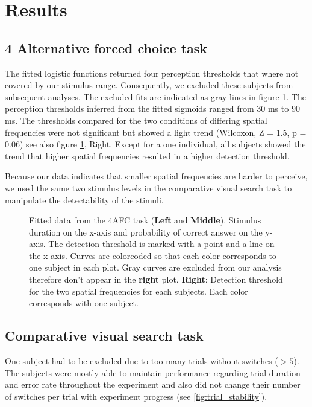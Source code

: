 \newpage
\section{Results}

\subsection{4 Alternative forced choice task}

The fitted logistic functions returned four perception thresholds that where not covered by our stimulus range. Consequently, we excluded these subjects from subsequent analyses. The excluded fits are indicated as gray lines in figure \ref{fig:4afc_psychofit}. The perception thresholds inferred from the fitted sigmoids ranged from 30 ms to 90 ms. The thresholds compared for the two conditions of differing spatial frequencies were not significant but showed a light trend (Wilcoxon, Z = 1.5, p = 0.06) see also figure \ref{fig:4afc_psychofit}, Right. Except for a one individual, all subjects showed the trend that higher spatial frequencies resulted in a higher detection threshold.

Because our data indicates that smaller spatial frequencies are harder to perceive, we used the same two stimulus levels in the comparative visual search task to manipulate the detectability of the stimuli.

\begin{figure}[H]
    \centering
    
    \caption[4AFC psychofit]{Fitted data from the 4AFC task (\textbf{Left} and \textbf{Middle}). Stimulus duration on the x-axis and probability of correct answer on the y-axis. The detection threshold is marked with a point and a line on the x-axis. Curves are colorcoded so that each color corresponds to one subject in each plot. Gray curves are excluded from our analysis therefore don't appear in the \textbf{right} plot. \textbf{Right}: Detection threshold for the two spatial frequencies for each subjects. Each color corresponds with one subject.}
    \label{fig:4afc_psychofit}
\end{figure}

\subsection{Comparative visual search task}
One subject had to be excluded due to too many trials without switches ($>5$). The subjects were mostly able to maintain performance regarding trial duration and error rate throughout the experiment and also did not change their number of switches per trial with experiment progress (see \ref{fig:trial_stability}). 

